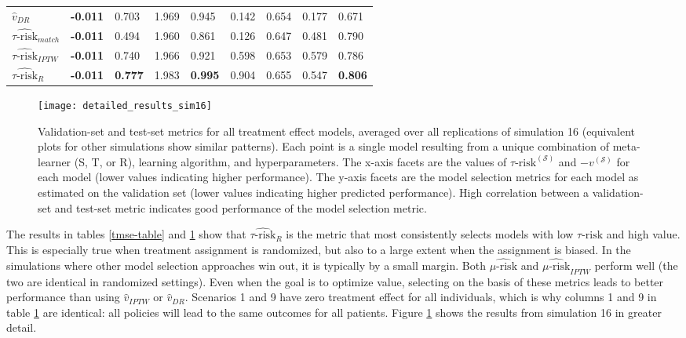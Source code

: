 \begin{table}[h!t]
\begin{tabular}{lllllllll}
  $\hat v_{DR}$ & \bfseries{-0.011} & 0.703 & 1.969 & 0.945 & 0.142 & 0.654 & 0.177 & 0.671 \\ 
  $\widehat{\tau\text{-risk}}_{match}$ & \bfseries{-0.011} & 0.494 & 1.960 & 0.861 & 0.126 & 0.647 & 0.481 & 0.790 \\ 
  $\widehat{\tau\text{-risk}}_{IPTW}$ & \bfseries{-0.011} & 0.740 & 1.966 & 0.921 & 0.598 & 0.653 & 0.579 & 0.786 \\ 
  $\widehat{\tau\text{-risk}}_{R}$ & \bfseries{-0.011} & \bfseries{0.777} & 1.983 & \bfseries{0.995} & 0.904 & 0.655 & 0.547 & \bfseries{0.806} \\ 
   \hline
\end{tabular}
\label{value-table}
\end{table}

\begin{figure}
  \centering
    \texttt{[image: detailed\_results\_sim16]}
      \caption{Validation-set and test-set metrics for all treatment effect models, averaged over all replications of simulation 16 (equivalent plots for other simulations show similar patterns). Each point is a single model resulting from a unique combination of meta-learner (S, T, or R), learning algorithm, and hyperparameters. The x-axis facets are the values of $\tau\text{-risk}^{(\mathcal{S})}$ and $-v^{(\mathcal{S})}$ for each model (lower values indicating higher performance). The y-axis facets are the model selection metrics for each model as estimated on the validation set (lower values indicating higher predicted performance). High correlation between a validation-set and test-set metric indicates good performance of the model selection metric.}
      \label{details16}
\end{figure}

The results in tables \ref{tmse-table} and \ref{value-table} show that $\widehat{\tau\text{-risk}}_{R}$ is the metric that most consistently selects models with low $\tau\text{-risk}$ and high value. This is especially true when treatment assignment is randomized, but also to a large extent when the assignment is biased. In the simulations where other model selection approaches win out, it is typically by a small margin. Both $\widehat{\mu\text{-risk}}$ and $\widehat{\mu\text{-risk}}_{IPTW}$ perform well (the two are identical in randomized settings). Even when the goal is to optimize value, selecting on the basis of these metrics leads to better performance than using $\hat v_{IPTW}$ or $\hat v_{DR}$. Scenarios 1 and 9 have zero treatment effect for all individuals, which is why columns 1 and 9 in table \ref{value-table} are identical: all policies will lead to the same outcomes for all patients. Figure \ref{details16} shows the results from simulation 16 in greater detail.


